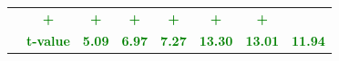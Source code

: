 \documentclass[11pt,english,a4paper,hidelinks]{book}
\begin{document}
\begin{table}[H]
\begin{tabular}{lccccccc}
                     & \textbf{\textcolor{green}{+}}
                     & \textbf{\textcolor{green}{+}}
                     & \textbf{\textcolor{green}{+}}
                     & \textbf{\textcolor{green}{+}}
                     & \textbf{\textcolor{green}{+}}
                     & \textbf{\textcolor{green}{+}} \\
            & \textbf{\textcolor{green}{t-value}}
                     & \textbf{\textcolor{green}{5.09}}
                     & \textbf{\textcolor{green}{6.97}}
                     & \textbf{\textcolor{green}{7.27}}
                     & \textbf{\textcolor{green}{13.30}}
                     & \textbf{\textcolor{green}{13.01}}
                     & \textbf{\textcolor{green}{11.94}} \\
        \bottomrule
    \end{tabular}
    \label{tab:dividend_windowed_reformat}
\end{table}
\end{document}
